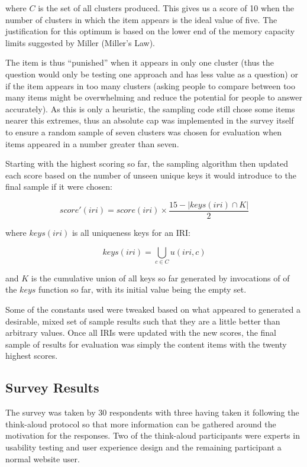 \noindent where $C$ is the set of all clusters produced. This gives
us a score of 10 when the number of clusters in which the item appears
is the ideal value of five. The justification for this optimum is
based on the lower end of the memory capacity limits suggested by
Miller\cite{miller1956magical} (Miller's Law).

The item is thus ``punished'' when it appears in only one cluster
(thus the question would only be testing one approach and has less
value as a question) or if the item appears in too many clusters
(asking people to compare between too many items might be
overwhelming and reduce the potential for people to answer
accurately). As this is only a heuristic, the sampling code still
chose some items nearer this extremes, thus an absolute cap was
implemented in the survey itself to ensure a random sample of seven
clusters was chosen for evaluation when items appeared in a number
greater than seven.

Starting with the highest scoring so far, the sampling algorithm
then updated each score based on the number of unseen unique keys
it would introduce to the final sample if it were chosen:

$$
score'(iri) = score(iri) \times \frac{15 - |keys(iri) \cap K|}{2}
$$

\noindent where $keys(iri)$ is all uniqueness keys for an IRI:

$$
keys(iri) = \bigcup_{c \in C} u(iri, c)
$$

\noindent and $K$ is the cumulative union of all keys so far
generated by invocations of of the $keys$ function so far, with its
initial value being the empty set.

Some of the constants used were tweaked based on what appeared to
generated a desirable, mixed set of sample results such that they are
a little better than arbitrary values. Once all IRIs were updated with
the new scores, the final sample of
results for evaluation was simply the content items with the twenty
highest scores.

\subsection{Survey Results}

The survey was taken by 30 respondents with three having taken it
following the think-aloud protocol\cite{lewis1982using} so that more
information can be gathered around the motivation for the responses.
Two of the think-aloud participants were experts in usability testing
and user experience design and the remaining participant a normal
website user.

